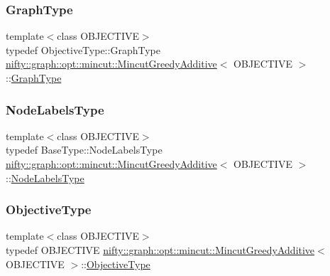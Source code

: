 \subsubsection{\texorpdfstring{Graph\+Type}{GraphType}}
{\footnotesize\ttfamily template$<$class O\+B\+J\+E\+C\+T\+I\+VE$>$ \\
typedef Objective\+Type\+::\+Graph\+Type \hyperlink{classnifty_1_1graph_1_1opt_1_1mincut_1_1MincutGreedyAdditive}{nifty\+::graph\+::opt\+::mincut\+::\+Mincut\+Greedy\+Additive}$<$ O\+B\+J\+E\+C\+T\+I\+VE $>$\+::\hyperlink{classnifty_1_1graph_1_1opt_1_1mincut_1_1MincutGreedyAdditive_a3bd8a5b329b83aead0cab24bd24fa884}{Graph\+Type}}

\mbox{\label{classnifty_1_1graph_1_1opt_1_1mincut_1_1MincutGreedyAdditive_a5a8855589a1e752e63650d8e678fc162}} 
\subsubsection{\texorpdfstring{Node\+Labels\+Type}{NodeLabelsType}}
{\footnotesize\ttfamily template$<$class O\+B\+J\+E\+C\+T\+I\+VE$>$ \\
typedef Base\+Type\+::\+Node\+Labels\+Type \hyperlink{classnifty_1_1graph_1_1opt_1_1mincut_1_1MincutGreedyAdditive}{nifty\+::graph\+::opt\+::mincut\+::\+Mincut\+Greedy\+Additive}$<$ O\+B\+J\+E\+C\+T\+I\+VE $>$\+::\hyperlink{classnifty_1_1graph_1_1opt_1_1mincut_1_1MincutGreedyAdditive_a5a8855589a1e752e63650d8e678fc162}{Node\+Labels\+Type}}

\mbox{\label{classnifty_1_1graph_1_1opt_1_1mincut_1_1MincutGreedyAdditive_a1e4f0fc6675ac7d977619126bfd6e143}} 
\subsubsection{\texorpdfstring{Objective\+Type}{ObjectiveType}}
{\footnotesize\ttfamily template$<$class O\+B\+J\+E\+C\+T\+I\+VE$>$ \\
typedef O\+B\+J\+E\+C\+T\+I\+VE \hyperlink{classnifty_1_1graph_1_1opt_1_1mincut_1_1MincutGreedyAdditive}{nifty\+::graph\+::opt\+::mincut\+::\+Mincut\+Greedy\+Additive}$<$ O\+B\+J\+E\+C\+T\+I\+VE $>$\+::\hyperlink{classnifty_1_1graph_1_1opt_1_1mincut_1_1MincutGreedyAdditive_a1e4f0fc6675ac7d977619126bfd6e143}{Objective\+Type}}


